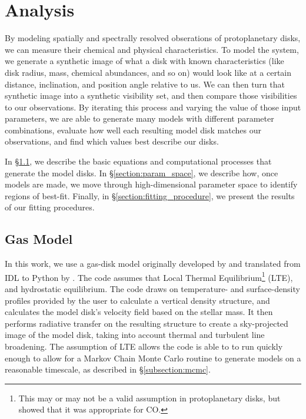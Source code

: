 \chapter{Analysis}
\label{chap:analysis}

By modeling spatially and spectrally resolved obserations of protoplanetary disks, we can measure their chemical and physical characteristics. To model the system, we generate a synthetic image of what a disk with known characteristics (like disk radius, mass, chemical abundances, and so on) would look like at a certain distance, inclination, and position angle relative to us. We can then turn that synthetic image into a synthetic visibility set, and then compare those visibilities to our observations. By iterating this process and varying the value of those input parameters, we are able to generate many models with different parameter combinations, evaluate how well each resulting model disk matches our observations, and find which values best describe our disks.


In \S\ref{section:gas_model}, we describe the basic equations and computational processes that generate the model disks. In \S\ref{section:param_space}, we describe how, once models are made, we move through high-dimensional parameter space to identify regions of best-fit. Finally, in \S\ref{section:fitting_procedure}, we present the results of our fitting procedures.


\section{Gas Model}
\label{section:gas_model}

In this work, we use a gas-disk model originally developed by \citet{Rosenfeld2012,Rosenfeld2013} and translated from IDL to Python by \cite{Flaherty2015}. The code assumes that Local Thermal Equilibrium\footnote{This may or may not be a valid assumption in protoplanetary disks, but \cite{Pavlyuchenkov2007} showed that it was appropriate for CO.} (LTE), and hydrostatic equilibrium. The code draws on temperature- and surface-density profiles provided by the user to calculate a vertical density structure, and calculates the model disk's velocity field based on the stellar mass. It then performs radiative transfer on the resulting structure to create a sky-projected image of the model disk, taking into account thermal and turbulent line broadening. The assumption of LTE allows the code is able to to run quickly enough to allow for a Markov Chain Monte Carlo routine to generate models on a reasonable timescale, as described in \S\ref{subsection:mcmc}.




